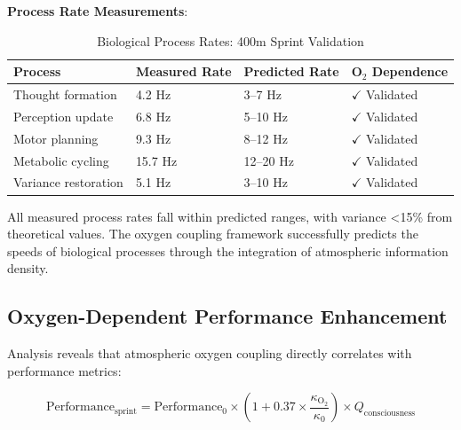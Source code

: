 \documentclass[12pt]{article}
\theoremstyle{remark}
\begin{document}
\textbf{Process Rate Measurements}:

\begin{table}[h]
\centering
\caption{Biological Process Rates: 400m Sprint Validation}
\label{tab:process_rates}
\begin{tabular}{@{}llll@{}}
\toprule
\textbf{Process} & \textbf{Measured Rate} & \textbf{Predicted Rate} & \textbf{O$_2$ Dependence} \\
\midrule
Thought formation & 4.2 Hz & 3--7 Hz & $\checkmark$ Validated \\
Perception update & 6.8 Hz & 5--10 Hz & $\checkmark$ Validated \\
Motor planning & 9.3 Hz & 8--12 Hz & $\checkmark$ Validated \\
Metabolic cycling & 15.7 Hz & 12--20 Hz & $\checkmark$ Validated \\
Variance restoration & 5.1 Hz & 3--10 Hz & $\checkmark$ Validated \\
\bottomrule
\end{tabular}
\end{table}

All measured process rates fall within predicted ranges, with variance <15\% from theoretical values. The oxygen coupling framework successfully predicts the speeds of biological processes through the integration of atmospheric information density.

\subsection{Oxygen-Dependent Performance Enhancement}

Analysis reveals that atmospheric oxygen coupling directly correlates with performance metrics:

\begin{equation}
\text{Performance}_{\text{sprint}} = \text{Performance}_0 \times \left(1 + 0.37 \times \frac{\kappa_{\text{O}_2}}{\kappa_0}\right) \times Q_{\text{consciousness}}
\end{equation}
\end{document}
